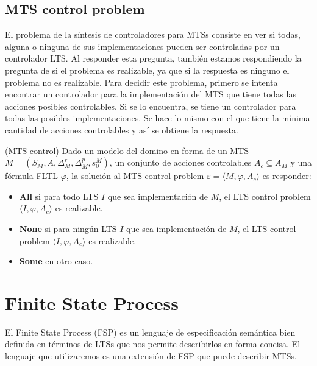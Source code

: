 \subsection{MTS	control problem}
\label{sec:MTS_control}

El problema de la síntesis de controladores para MTSs \cite{MTSControl} consiste en ver si todas, alguna o ninguna de sus 
implementaciones pueden ser controladas por un controlador LTS. Al responder esta pregunta, también estamos respondiendo 
la pregunta de si el problema es realizable, ya que si la respuesta es ninguno el problema no es realizable. Para decidir 
este problema, primero se intenta encontrar un controlador para la implementación del MTS que tiene todas las acciones 
posibles controlables. Si se lo encuentra, se tiene un controlador para todas las posibles implementaciones. Se hace lo 
mismo con el que tiene la mínima cantidad de acciones controlables y así se obtiene la respuesta.

\begin{definition}{(MTS control)}
Dado un modelo del domino en forma de un MTS $M = (S_{M}, A, \Delta_{M}^{r}, \Delta_{M}^{p}, s_{0}^{M})$, un conjunto de 
acciones controlables $A_{c} \subseteq A_{M}$ y una fórmula FLTL $\varphi$, la solución al MTS control problem 
$\varepsilon = \langle M, \varphi, A_{c} \rangle$ es responder:

\begin{itemize}

\item
\textbf{All} si para todo LTS $I$ que sea implementación de $M$, el LTS control problem $\langle I, \varphi, A_{c} \rangle$ es realizable.

\item
\textbf{None} si para ningún LTS $I$ que sea implementación de $M$, el LTS control problem $\langle I, \varphi, A_{c} \rangle$ es realizable.

\item
\textbf{Some} en otro caso.

\end{itemize}

\end{definition}

\section{Finite State Process}
El Finite State Process (FSP) \cite{FSP} es un lenguaje de especificación semántica bien definida en términos de LTSs que nos permite describirlos 
en forma concisa. El lenguaje que utilizaremos es una extensión de FSP que 
puede describir MTSs.